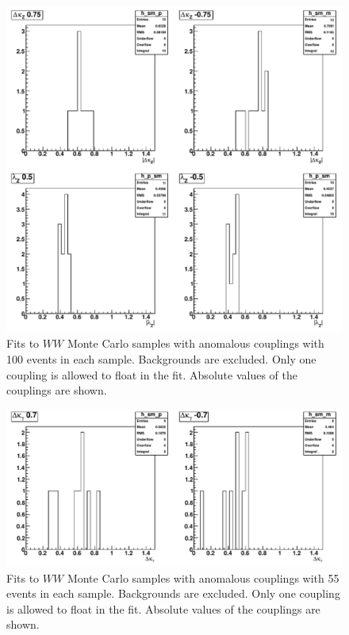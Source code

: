 \begin{figure}[tp]
  \centerline{
    \includegraphics[width=1.0\textwidth]{figures/fit_wwATGC_mc_1D_abs}
  }

  \caption[1D fits to WW aTGC Monte Carlo] {Fits to $WW$ Monte Carlo
    samples with anomalous couplings with 100 events in each sample. Backgrounds
    are excluded. Only one coupling is allowed to float in the fit. Absolute
    values of the couplings are shown.}
  \label{fig:fit_wwATGC_mc_1D_abs}
\end{figure}

\begin{figure}[tp]
  \centerline{
    \includegraphics[width=1.0\textwidth]{figures/fit_wwATGC_mc_1D_abs2}
  }

  \caption[1D fits to WW aTGC Monte Carlo] {Fits to $WW$ Monte Carlo
    samples with anomalous couplings with 55 events in each
    sample. Backgrounds are excluded. Only one coupling is allowed to
    float in the fit. Absolute values of the couplings are
    shown.}  \label{fig:fit_wwATGC_mc_1D_abs2}
\end{figure}
